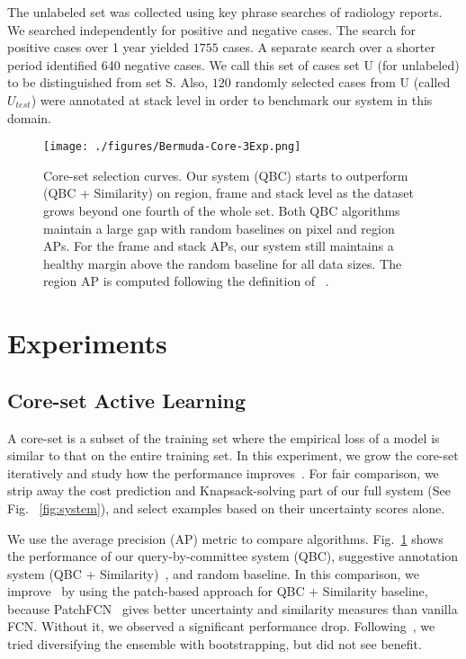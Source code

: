 \documentclass{llncs}
\begin{document}
The unlabeled set was collected using key phrase searches of radiology reports. We searched independently for positive and negative cases. The search for positive cases over 1 year yielded $1755$ cases. A separate search over a shorter period identified 640 negative cases. We call this set of cases set U (for unlabeled) to be distinguished from set S. Also, $120$ randomly selected cases from U (called $U_{test}$) were annotated at stack level in order to benchmark our system in this domain.  %

\begin{figure}[t]
    \centering
    \texttt{[image: ./figures/Bermuda-Core-3Exp.png]}
    \caption{Core-set selection curves. Our system (QBC) starts to outperform ~\cite{yang2017suggestive} (QBC + Similarity) on region, frame and stack level as the dataset grows beyond one fourth of the whole set. Both QBC algorithms maintain a large gap with random baselines on pixel and region APs. For the frame and stack APs, our system still maintains a healthy margin above the random baseline for all data sizes. The region AP is computed following the definition of ~\cite{arxiv2018PatchFCN}.}
    \label{fig:core-set}
    \vspace*{-0.3cm}
\end{figure}


\section{Experiments}
\vspace*{-0.05cm}

\subsection{Core-set Active Learning}
\vspace*{-0.05cm}
A core-set is a subset of the training set where the empirical loss of a model is similar to that on the entire training set. In this experiment, we grow the core-set iteratively and study how the performance improves~\cite{yang2017suggestive,sener2018active}. For fair comparison, we strip away the cost prediction and Knapsack-solving part of our full system (See Fig. ~\ref{fig:system}), and select examples based on their uncertainty scores alone. 

We use the average precision (AP) metric to compare algorithms. Fig.~\ref{fig:core-set} shows the performance of our query-by-committee system (QBC), suggestive annotation system (QBC + Similarity)~\cite{yang2017suggestive}, and random baseline. In this comparison, we improve~\cite{yang2017suggestive} by using the patch-based approach for QBC + Similarity baseline, because PatchFCN~\cite{arxiv2018PatchFCN} gives better uncertainty and similarity measures than vanilla FCN. Without it, we observed a significant performance drop. Following~\cite{yang2017suggestive}, we tried diversifying the ensemble with bootstrapping, but did not see benefit. 
\end{document}
